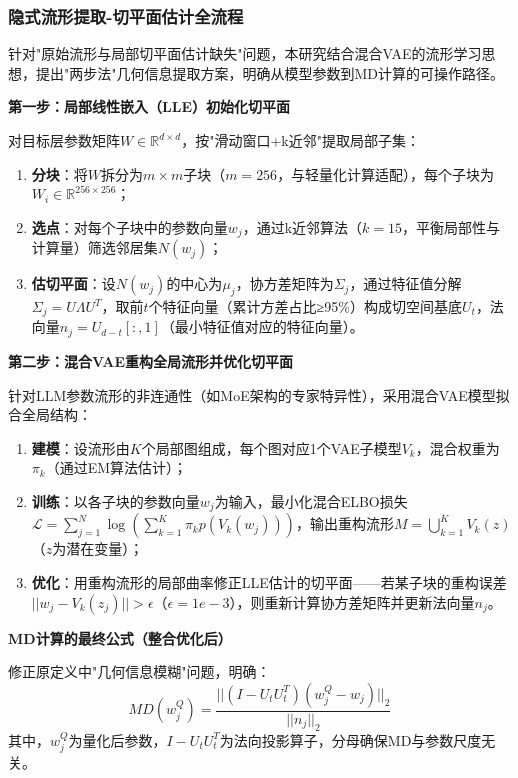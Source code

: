 \subsubsection{隐式流形提取-切平面估计全流程}

针对"原始流形与局部切平面估计缺失"问题，本研究结合混合VAE的流形学习思想，提出"两步法"几何信息提取方案，明确从模型参数到MD计算的可操作路径。

\textbf{第一步：局部线性嵌入（LLE）初始化切平面}

对目标层参数矩阵$W \in \mathbb{R}^{d \times d}$，按"滑动窗口+k近邻"提取局部子集：

\begin{enumerate}
\item \textbf{分块}：将$W$拆分为$m \times m$子块（$m=256$，与轻量化计算适配），每个子块为$W_i \in \mathbb{R}^{256 \times 256}$；
\item \textbf{选点}：对每个子块中的参数向量$w_j$，通过k近邻算法（$k=15$，平衡局部性与计算量）筛选邻居集$N(w_j)$；
\item \textbf{估切平面}：设$N(w_j)$的中心为$\mu_j$，协方差矩阵为$\Sigma_j$，通过特征值分解$\Sigma_j = U\Lambda U^T$，取前$t$个特征向量（累计方差占比≥95\%）构成切空间基底$U_t$，法向量$n_j = U_{d-t}[:,1]$（最小特征值对应的特征向量）。
\end{enumerate}

\textbf{第二步：混合VAE重构全局流形并优化切平面}

针对LLM参数流形的非连通性（如MoE架构的专家特异性），采用混合VAE模型拟合全局结构：

\begin{enumerate}
\item \textbf{建模}：设流形由$K$个局部图组成，每个图对应1个VAE子模型$V_k$，混合权重为$\pi_k$（通过EM算法估计）；
\item \textbf{训练}：以各子块的参数向量$w_j$为输入，最小化混合ELBO损失$\mathcal{L} = \sum_{j=1}^N \log(\sum_{k=1}^K \pi_k p(V_k(w_j)))$，输出重构流形$M = \bigcup_{k=1}^K V_k(z)$（$z$为潜在变量）；
\item \textbf{优化}：用重构流形的局部曲率修正LLE估计的切平面——若某子块的重构误差$||w_j - V_k(z_j)|| > \epsilon$（$\epsilon=1e-3$），则重新计算协方差矩阵并更新法向量$n_j$。
\end{enumerate}

\textbf{MD计算的最终公式（整合优化后）}

修正原定义中"几何信息模糊"问题，明确：
\begin{equation}
MD(w_j^Q) = \frac{||(I - U_t U_t^T)(w_j^Q - w_j)||_2}{||n_j||_2}
\end{equation}
其中，$w_j^Q$为量化后参数，$I - U_t U_t^T$为法向投影算子，分母确保MD与参数尺度无关。

